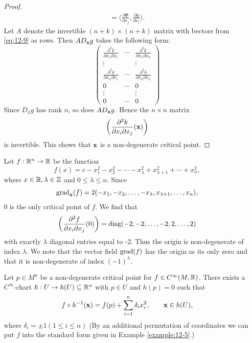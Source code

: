 \begin{proof}
\begin{align*}
      = \biggl\langle \frac{\partial \Phi}{\partial x_j}, \frac{\partial g}{\partial x_i}\biggr\rangle.
  \end{align*}
  Let $A$ denote the invertible $(n+k)\times(n+k)$ matrix with bectors from \eqref{eq:12-9} as rows. 
  Then $AD_{\mathbf{x}}g$ takes the following form:
  \[
    \begin{pmatrix}
      \frac{\partial^2 k}{\partial x_1\partial x_1} & \cdots & \frac{\partial^2 k}{\partial x_1\partial x_n}\\
      \vdots &  & \vdots\\
      \frac{\partial^2 k}{\partial x_n\partial x_1} & \cdots & \frac{\partial^2 k}{\partial x_n\partial x_n}\\
      0 & \cdots & 0 \\
      \vdots &  & \vdots\\
      0 & \cdots & 0
    \end{pmatrix}
  \]
  Since $D_xg$ has rank $n$, so does $AD_{\mathbf{x}}g$. Hence the $n\times n$ matrix 
  \[
    \left(\frac{\partial^2 k}{\partial x_i\partial x_j}(\mathbf{x})\right)
  \]
  is invertible. This shows that $\mathbf{x}$ is a non-degenerate critical point.
\end{proof}

\begin{example}\label{example:12-5}
  Let $f:{\mathbb{R}}^n\to{\ensuremath{\mathbb{R}}}$ be the function
  \[
    f(x) = c - x_1^2 - x_2^2 - \cdots - x_\lambda^2 + x_{\lambda+1}^2 + \cdots + x_n^2,
  \]
  where $x\in{\ensuremath{\mathbb{R}}}, \lambda\in{\ensuremath{\mathbb{Z}}}$ and $0\le\lambda\le n$. Since 
  \[
    \operatorname{grad}_{\mathbf{x}}(f) = 2(-x_1, -x_2, \ldots, -x_\lambda, x_{\lambda+1}, \ldots, x_n),
  \]
  0 is the only critical point of $f$. We find that 
  \[
    \left(\frac{\partial^2 f}{\partial x_i\partial x_j}(0)\right)
    = \mathrm{diag}(-2, -2, \ldots, -2, 2, \ldots, 2)
  \]
  with exactly $\lambda$ diagonal entries equal to -2. Thus the origin is non-degenerate
  of index $\lambda$. We note that the vector field $\operatorname{grad}(f)$ has the origin as its only zero
  and that it is non-degenerate of index $(-1)^\lambda$.
\end{example}

\begin{theorem}\label{theorem:12-6}
  Let $p\in M^n$ be a non-degenerate critical point for $f\in C^\infty(M,{\mathbb{R}})$. There exists a $C^\infty$-chart 
  $h:U\to h(U)\subseteq{\ensuremath{\mathbb{R}}}^n$ with $p\in U$ and $h(p)=0$ such that 
  \[
    f\circ h^{-1}(\mathbf{x}) = f(p) + \sum_{i=1}^n{\delta_i x_i^2},\qquad \mathbf{x}\in h(U),
  \]
  where $\delta_i=\pm1 (1\le i\le n)$ (By an additional permutation of coordinates we can put $f$ into the 
  standard form given in Example \ref{example:12-5}.)
\end{theorem}

